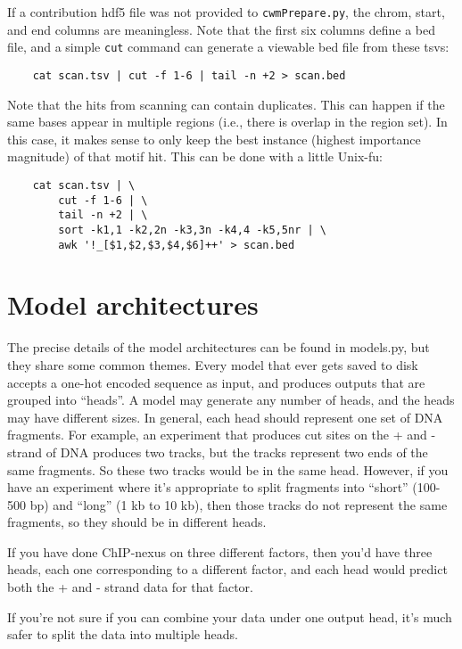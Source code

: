 \documentclass{article}
\begin{document}
If a contribution hdf5 file was not provided to \texttt{cwmPrepare.py}, the chrom, start,
and end columns are meaningless.
Note that the first six columns define a bed file, and a simple \texttt{cut}
command can generate a viewable bed file from these tsvs:

\begin{lstlisting}
    cat scan.tsv | cut -f 1-6 | tail -n +2 > scan.bed
\end{lstlisting}

Note that the hits from scanning can contain duplicates. This can happen if the same bases
appear in multiple regions (i.e., there is overlap in the region set). In this case, it makes
sense to only keep the best instance (highest importance magnitude) of that motif hit.
This can be done with a little Unix-fu:

\begin{lstlisting}
    cat scan.tsv | \
        cut -f 1-6 | \
        tail -n +2 | \
        sort -k1,1 -k2,2n -k3,3n -k4,4 -k5,5nr | \
        awk '!_[$1,$2,$3,$4,$6]++' > scan.bed
\end{lstlisting}
\newpage
\section{Model architectures}\label{sec:modelArchitectures}

The precise details of the model architectures can be found in models.py, but they share some
common themes.
Every model that ever gets saved to disk accepts a one-hot encoded sequence as input, and produces
outputs that are grouped into ``heads''.
A model may generate any number of heads, and the heads may have different sizes.
In general, each head should represent one set of DNA fragments. For example, an experiment that
produces cut sites on the + and - strand of DNA produces two tracks, but the tracks represent two
ends of the same fragments. So these two tracks would be in the same head.
However, if you have an experiment where it's appropriate to split fragments into ``short''
(100-500 bp) and ``long'' (1 kb to 10 kb), then those tracks do not represent the same
fragments, so they should be in different heads.

If you have done ChIP-nexus on three different factors, then you'd have three heads, each one
corresponding to a different factor, and each head would predict both the + and - strand data
for that factor.

If you're not sure if you can combine your data under one output head, it's much safer to split
the data into multiple heads.
\end{document}
